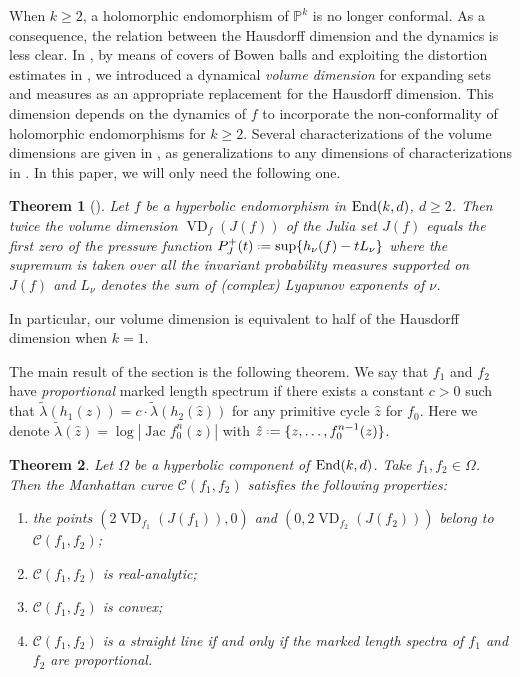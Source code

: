 \documentclass[11pt]{amsart}
\theoremstyle{plain}
\newtheorem{thm}{Theorem}[section]
\theoremstyle{definition}
\theoremstyle{remark}
\newcommand*{\defeq}{\mathrel{\vcenter{\baselineskip0.5ex \lineskiplimit0pt
			\hbox{\scriptsize.}\hbox{\scriptsize.}}}%
	=}
\DeclareMathOperator{\VD}{VD}
\DeclareMathOperator{\Jac}{Jac}
\begin{document}
When $k\geq 2$,
a holomorphic endomorphism of $\mathbb{P}^k$
is no longer conformal.
As a consequence, 
the relation between the Hausdorff dimension 
and the dynamics is less clear. 
In \cite{BHMane}, by means of covers of Bowen balls and exploiting the distortion estimates in \cite{BDM,BD19},
we introduced
a dynamical
\emph{volume dimension}
for expanding sets and measures as an appropriate replacement for the Hausdorff dimension. This dimension
depends on 
the dynamics of $f$ to incorporate
the non-conformality
of holomorphic endomorphisms for $k\ge2$.
Several characterizations of the volume dimensions
are given in \cite{BHMane}, as generalizations to any dimensions of characterizations in 
\cite{DU1,DU2, McMullen00, PU}. 
In this paper, we will only need the following one.

\begin{thm}[\cite{BHMane}] \label{thm_bh}
Let $f$ be a hyperbolic endomorphism in ${\rm End} (k,d)$, $d\geq 2$. Then
twice
the volume dimension 
$\VD_f(J(f))$ of the Julia set $J(f)$ 
equals the first zero of the pressure function $P_J^+(t) \defeq \sup\{h_\nu(f)-tL_\nu\}$ where the supremum is taken over all the invariant probability measures supported on $J(f)$ and $L_\nu$ denotes the sum of (complex) Lyapunov exponents of $\nu$.

\end{thm}

In particular, our volume dimension is equivalent to half of the Hausdorff dimension when $k=1$.

\medskip

The main result of the section
is the following theorem. We say that $f_1$ and $f_2$ have {\it proportional} marked length spectrum if there exists a constant $c>0$ such that $\widetilde{\lambda}(h_1(\hat{z})) = c\cdot \widetilde{\lambda}(h_2(\hat{z}))$ for any primitive cycle $\hat{z}$ for $f_0$. Here we denote $\widetilde{\lambda}(\hat{z}) = \log |\Jac f_0^n(z)|$ with $\hat{z}\defeq \{z,\ldots, f_0^{n-1}(z)\}$.
\begin{thm}\label{thm_curve_ana}
Let $\Omega$ be a 
hyperbolic component of ${\rm End}(k,d)$.
Take 
$f_1,f_2 \in \Omega$. 
Then the Manhattan curve $\mathcal{C}(f_1,f_2)$ satisfies the following properties:
\begin{enumerate}
\item the points $(2\VD_{f_1}(J(f_1)),0)$ and $(0,2\VD_{f_2} (J(f_2)))$ belong to
$\mathcal{C}(f_1,f_2)$;
\item $\mathcal{C}(f_1,f_2)$ is real-analytic;
\item $\mathcal{C}(f_1,f_2)$ is convex;
\item $\mathcal{C}(f_1,f_2)$ is a straight line if and only if the marked length spectra of $f_1$ and $f_2$ are proportional.
\end{enumerate}
\end{thm}
\end{document}
